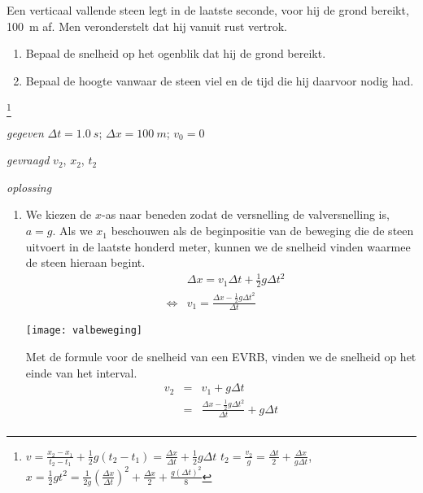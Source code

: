 \begin{exercise} Een verticaal vallende steen legt in de laatste seconde, voor hij de grond bereikt, \SI{100}{m} af. Men veronderstelt dat hij vanuit rust vertrok.
\begin{enumerate}
\item Bepaal de snelheid op het ogenblik dat hij de grond bereikt.
\item Bepaal de hoogte vanwaar de steen viel en de tijd die hij daarvoor nodig had.
\end{enumerate}
\begin{oplossing}
\footnote{$v=\frac{x_2-x_1}{t_2-t_1}+\frac{1}{2}g(t_2-t_1)=\frac{\Delta x}{\Delta t}+\frac{1}{2}g\Delta t$
\newline
$t_2=\frac{v_2}{g}=\frac{\Delta t}{2}+\frac{\Delta x}{g\Delta t}$, $x=\frac{1}{2}gt^2=\frac{1}{2g}\left(\frac{\Delta x}{\Delta t}\right)^2+\frac{\Delta x}{2}+\frac{g(\Delta t)^2}{8}$}
\item[\textit{gegeven}]$\Delta t=\SI{1,0}{s}$; $\Delta x=\SI{100}{m}$; $v_0=0$
\item[\textit{gevraagd}]$v_2$, $x_2$, $t_2$
\item[\textit{oplossing}]
\begin{enumerate}
\item 
\begin{minipage}[t]{.7\textwidth}
We kiezen de $x$-as naar beneden zodat de versnelling de valversnelling is, $a=g$. Als we $x_1$ beschouwen als de beginpositie van de beweging die de steen uitvoert in de laatste honderd meter, kunnen we de snelheid vinden waarmee de steen hieraan begint.
\begin{eqnarray*}
&&\Delta x=v_1\Delta t+\frac{1}{2}g\Delta t^2\\
&\Leftrightarrow&v_1=\frac{\Delta x-\frac{1}{2}g\Delta t^2}{\Delta t}
\end{eqnarray*}
\end{minipage}
\begin{minipage}[t][4.5cm][b]{.3\textwidth}
\texttt{[image: valbeweging]}
\end{minipage}
\newline
\newline
\newline
Met de formule voor de snelheid van een EVRB, vinden we de snelheid op het einde van het interval.
\begin{eqnarray*}
v_2&=&v_1+g\Delta t\\
&=&\frac{\Delta x-\frac{1}{2}g\Delta t^2}{\Delta t}+g\Delta t\\

\end{eqnarray*}
\end{enumerate}
\end{oplossing}
\end{exercise}
